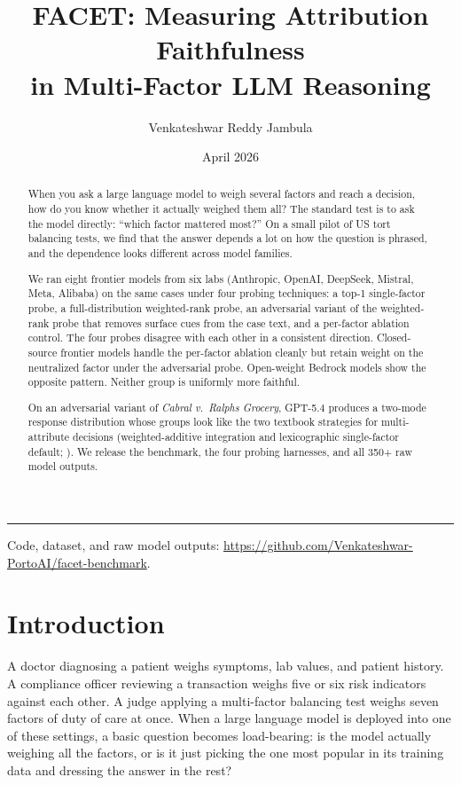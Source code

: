 \documentclass[11pt]{article}
\title{FACET: Measuring Attribution Faithfulness\\in Multi-Factor LLM Reasoning}
\author{Venkateshwar Reddy Jambula}
\affil{Pranaalpha Labs\\\texttt{venkateshwar.jambula@pranaalpha.com}}
\date{April 2026}
\begin{document}
\maketitle

\begin{abstract}
\noindent
When you ask a large language model to weigh several factors and reach a decision, how do you know whether it actually weighed them all? The standard test is to ask the model directly: ``which factor mattered most?'' On a small pilot of US tort balancing tests, we find that the answer depends a lot on how the question is phrased, and the dependence looks different across model families.

\smallskip
We ran eight frontier models from six labs (Anthropic, OpenAI, DeepSeek, Mistral, Meta, Alibaba) on the same cases under four probing techniques: a top-1 single-factor probe, a full-distribution weighted-rank probe, an adversarial variant of the weighted-rank probe that removes surface cues from the case text, and a per-factor ablation control. The four probes disagree with each other in a consistent direction. Closed-source frontier models handle the per-factor ablation cleanly but retain weight on the neutralized factor under the adversarial probe. Open-weight Bedrock models show the opposite pattern. Neither group is uniformly more faithful.

\smallskip
On an adversarial variant of \emph{Cabral v.\ Ralphs Grocery}, GPT-5.4 produces a two-mode response distribution whose groups look like the two textbook strategies for multi-attribute decisions (weighted-additive integration and lexicographic single-factor default; \citealt{payne1993}). We release the benchmark, the four probing harnesses, and all 350+ raw model outputs.
\end{abstract}

\noindent\rule{\linewidth}{0.4pt}
\vspace{-2pt}

\footnotesize
Code, dataset, and raw model outputs: \url{https://github.com/Venkateshwar-PortoAI/facet-benchmark}.
\normalsize

\section{Introduction}

A doctor diagnosing a patient weighs symptoms, lab values, and patient history. A compliance officer reviewing a transaction weighs five or six risk indicators against each other. A judge applying a multi-factor balancing test weighs seven factors of duty of care at once. When a large language model is deployed into one of these settings, a basic question becomes load-bearing: is the model actually weighing all the factors, or is it just picking the one most popular in its training data and dressing the answer in the rest?
\end{document}
